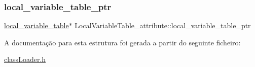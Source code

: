 \mbox{\label{struct_local_variable_table__attribute_a344c097a0c1792b8a042a8ef05cbfe68}} 
\subsubsection{\texorpdfstring{local\+\_\+variable\+\_\+table\+\_\+ptr}{local\_variable\_table\_ptr}}
{\footnotesize\ttfamily \hyperlink{structlocal__variable__table}{local\+\_\+variable\+\_\+table}$\ast$ Local\+Variable\+Table\+\_\+attribute\+::local\+\_\+variable\+\_\+table\+\_\+ptr}



A documentação para esta estrutura foi gerada a partir do seguinte ficheiro\+:\begin{DoxyCompactItemize}
\item 
\hyperlink{class_loader_8h}{class\+Loader.\+h}\end{DoxyCompactItemize}
